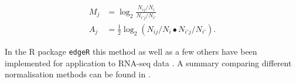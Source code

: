 \begin{eqnarray}
  \label{eq:MA-values}
  M_j &= \log_2 \frac{N_{ij} / N_i}{N_{i'j}/ N_{i'}} \\
  A_j &= \frac{1}{2} \log_2 \left(N_{ij}/ N_i \bullet N_{i'j} / N_{i'} \right).
\end{eqnarray}

In the R package \texttt{edgeR} this method as well as a few others have been implemented for application to RNA-seq data \citep{Robinson:2010cw}.
A summary comparing different normalisation methods can be found in \cite{Oshlack:2010kr}.


